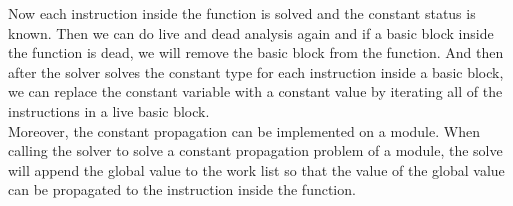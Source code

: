 Now each instruction inside the function is solved and the constant status is known. Then we can do live and dead analysis again and if a basic block inside the function is dead, we will remove the basic block from the function. And then after the solver solves the constant type for each instruction inside a basic block, we can replace the constant variable with a constant value by iterating all of the instructions in a live basic block. \\
Moreover, the constant propagation can be implemented on a module. When calling the solver to solve a constant propagation problem of a module, the solve will append the global value to the work list so that the value of the global value can be propagated to the instruction inside the function.
